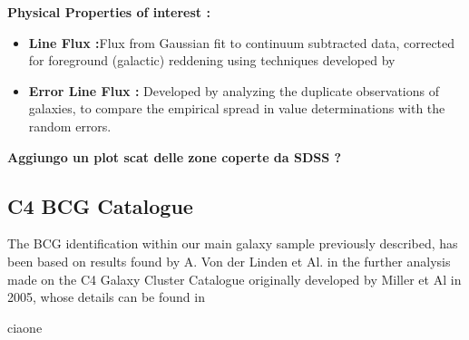 \textbf{Physical Properties of interest :}
\begin{itemize}
		\item \textbf{Line Flux :}Flux from Gaussian fit to continuum subtracted data, corrected for foreground (galactic) reddening using techniques developed by \cite{1994ApJ...422..158O}
		\item \textbf{Error Line Flux :} Developed by analyzing the duplicate observations of galaxies, to compare the empirical spread in value determinations with the random errors.

\end{itemize}

\textbf{Aggiungo un plot scat delle zone coperte da SDSS ?}


\subsection{C4 BCG Catalogue}
The BCG identification within our main galaxy sample previously described, has been based on results found by A. Von der Linden et Al. \cite{2007MNRAS.379..867V, 2009yCat..73790867V} in the further analysis made on the C4 Galaxy Cluster Catalogue originally developed by Miller et Al in 2005, whose details can be found in \cite{2005AJ....130..968M}

ciaone

